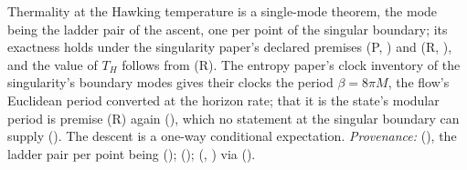 Thermality at the Hawking temperature is a single-mode theorem, the mode being the ladder pair of the ascent, one per point of the singular boundary; its exactness holds under the singularity paper's declared premises (P, ) and (R, ), and the value of $T_{H}$ follows from (R). The entropy paper's clock inventory of the singularity's boundary modes gives their clocks the period $\beta = 8\pi M$, the flow's Euclidean period converted at the horizon rate; that it is the state's modular period is premise (R) again (), which no statement at the singular boundary can supply (). The descent is a one-way conditional expectation. \emph{Provenance:} \cite[Thm.~7.3, Rem.~7.33]{ButlerT5} (), the ladder pair per point being \cite[Thm.~8.12]{ButlerT4} (); \cite[Lem.~4.2]{ButlerT8} (); \cite[Prop.~7.5, Thm.~7.6]{ButlerT1} (, ) via \cite[Fact~5.9]{ButlerT5} ().
